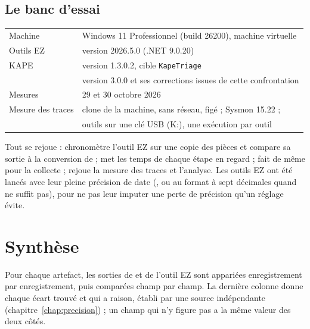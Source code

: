 \documentclass[11pt,a4paper,oneside]{report}
\begin{document}
\section{Le banc d'essai}

\begin{tabular}{@{}ll@{}}
Machine & Windows 11 Professionnel (build 26200), machine virtuelle \\
Outils EZ & version 2026.5.0 (.NET 9.0.20) \\
KAPE & version 1.3.0.2, cible \texttt{KapeTriage} \\
\wac{} & version 3.0.0 et ses corrections issues de cette confrontation \\
Mesures & 29 et 30 octobre 2026 \\
Mesure des traces & clone de la machine, sans réseau, figé ; Sysmon 15.22 ; \\
                  & outils sur une clé USB (K:), une exécution par outil \\
\end{tabular}

Tout se rejoue :  chronomètre l'outil
EZ sur une copie des pièces et compare sa sortie à la conversion de \wac{} ;
 met les temps de chaque étape en regard ;
 fait de même pour la collecte ;
 rejoue la mesure des traces et
 l'analyse. Les outils EZ ont
été lancés avec leur pleine précision de date (, ou  au format
à sept décimales quand  ne suffit pas), pour ne pas leur imputer une
perte de précision qu'un réglage évite.

\chapter{Synthèse}

Pour chaque artefact, les sorties de \wac{} et de l'outil EZ sont appariées
enregistrement par enregistrement, puis comparées champ par champ. La dernière
colonne donne chaque écart trouvé et qui a raison, établi par une source
indépendante (chapitre~\ref{chap:precision}) ; un champ qui n'y figure pas a
la même valeur des deux côtés.
\end{document}
